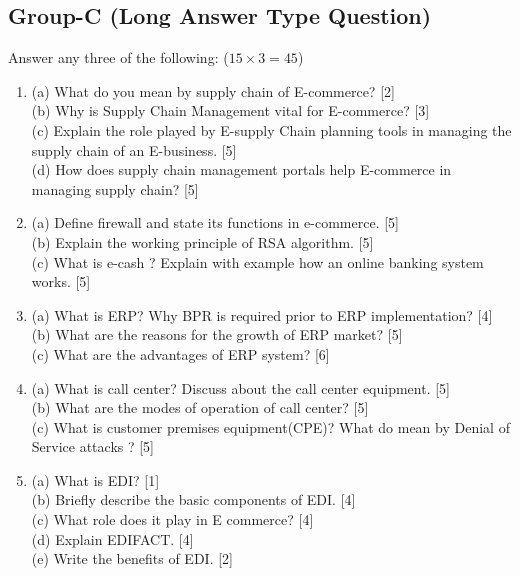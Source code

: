 \documentclass{article}
\begin{document}
\subsection*{Group-C (Long Answer Type Question)}
Answer any three of the following: ($15 \times 3 = 45$)
\begin{enumerate}
    \item[7.] 
    (a) What do you mean by supply chain of E-commerce? [2] \\
    (b) Why is Supply Chain Management vital for E-commerce? [3] \\
    (c) Explain the role played by E-supply Chain planning tools in managing the supply chain of an E-business. [5] \\
    (d) How does supply chain management portals help E-commerce in managing supply chain? [5]
    \item[8.] 
    (a) Define firewall and state its functions in e-commerce. [5] \\
    (b) Explain the working principle of RSA algorithm. [5] \\
    (c) What is e-cash ? Explain with example how an online banking system works. [5]
    \item[9.] 
    (a) What is ERP? Why BPR is required prior to ERP implementation? [4] \\
    (b) What are the reasons for the growth of ERP market? [5] \\
    (c) What are the advantages of ERP system? [6]
    \item[10.] 
    (a) What is call center? Discuss about the call center equipment. [5] \\
    (b) What are the modes of operation of call center? [5] \\
    (c) What is customer premises equipment(CPE)? What do mean by Denial of Service attacks ? [5]
    \item[11.] 
    (a) What is EDI? [1] \\
    (b) Briefly describe the basic components of EDI. [4] \\
    (c) What role does it play in E commerce? [4] \\
    (d) Explain EDIFACT. [4] \\
    (e) Write the benefits of EDI. [2]
\end{enumerate}
\end{document}
